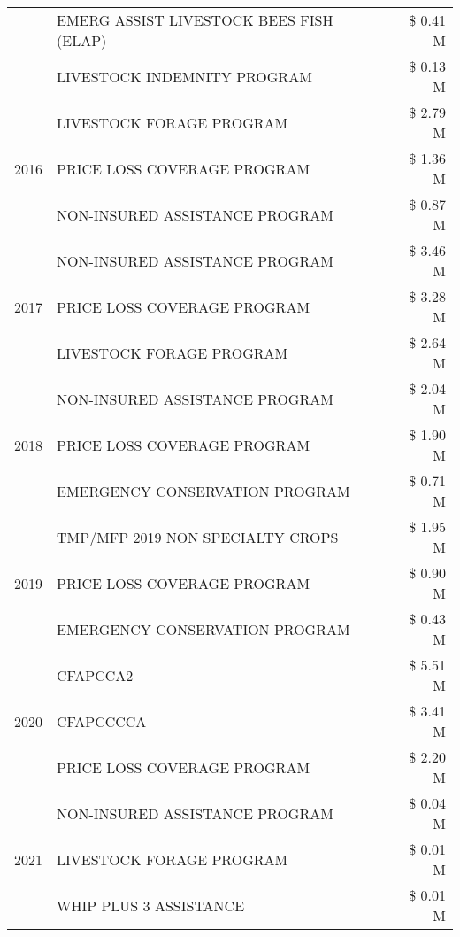 \begin{tabular}{llr}
 & EMERG ASSIST LIVESTOCK BEES FISH (ELAP) & \$ 0.41 M \\
 & LIVESTOCK INDEMNITY PROGRAM & \$ 0.13 M \\
\cline{1-3}
\multirow[t]{3}{*}{2016} & LIVESTOCK FORAGE PROGRAM & \$ 2.79 M \\
 & PRICE LOSS COVERAGE PROGRAM & \$ 1.36 M \\
 & NON-INSURED ASSISTANCE PROGRAM & \$ 0.87 M \\
\cline{1-3}
\multirow[t]{3}{*}{2017} & NON-INSURED ASSISTANCE PROGRAM & \$ 3.46 M \\
 & PRICE LOSS COVERAGE PROGRAM & \$ 3.28 M \\
 & LIVESTOCK FORAGE PROGRAM & \$ 2.64 M \\
\cline{1-3}
\multirow[t]{3}{*}{2018} & NON-INSURED ASSISTANCE PROGRAM & \$ 2.04 M \\
 & PRICE LOSS COVERAGE PROGRAM & \$ 1.90 M \\
 & EMERGENCY CONSERVATION PROGRAM & \$ 0.71 M \\
\cline{1-3}
\multirow[t]{3}{*}{2019} & TMP/MFP 2019 NON SPECIALTY CROPS & \$ 1.95 M \\
 & PRICE LOSS COVERAGE PROGRAM & \$ 0.90 M \\
 & EMERGENCY CONSERVATION PROGRAM & \$ 0.43 M \\
\cline{1-3}
\multirow[t]{3}{*}{2020} & CFAPCCA2 & \$ 5.51 M \\
 & CFAPCCCCA & \$ 3.41 M \\
 & PRICE LOSS COVERAGE PROGRAM & \$ 2.20 M \\
\cline{1-3}
\multirow[t]{3}{*}{2021} & NON-INSURED ASSISTANCE PROGRAM & \$ 0.04 M \\
 & LIVESTOCK FORAGE PROGRAM & \$ 0.01 M \\
 & WHIP PLUS 3 ASSISTANCE & \$ 0.01 M \\
\cline{1-3}
\bottomrule
\end{tabular}
